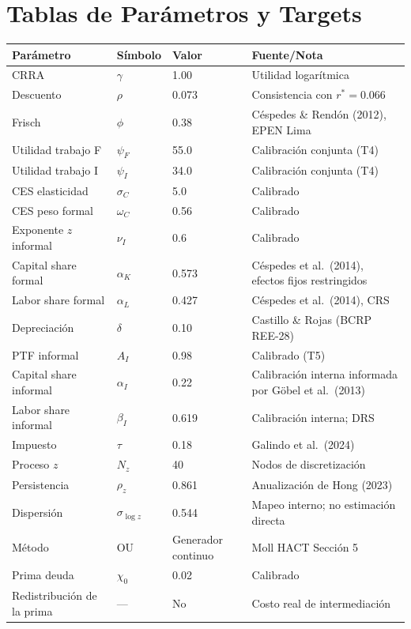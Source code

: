 \documentclass[12pt]{article}
\begin{document}
\clearpage
\section{Tablas de Parámetros y Targets}

\begin{center}
\small
\begin{tabularx}{\textwidth}{lllX}
\toprule
Parámetro & Símbolo & Valor & Fuente/Nota \\
\midrule
CRRA & $\gamma$ & 1.00 & Utilidad logarítmica \\
Descuento & $\rho$ & 0.073 & Consistencia con $r^*=0.066$ \\
Frisch & $\phi$ & 0.38 & Céspedes \& Rendón (2012), EPEN Lima \\
Utilidad trabajo F & $\psi_F$ & 55.0 & Calibración conjunta (T4) \\
Utilidad trabajo I & $\psi_I$ & 34.0 & Calibración conjunta (T4) \\
CES elasticidad & $\sigma_C$ & 5.0 & Calibrado \\
CES peso formal & $\omega_C$ & 0.56 & Calibrado \\
Exponente $z$ informal & $\nu_I$ & 0.6 & Calibrado \\
\addlinespace
Capital share formal & $\alpha_K$ & 0.573 & Céspedes et al.\ (2014), efectos fijos restringidos \\
Labor share formal & $\alpha_L$ & 0.427 & Céspedes et al.\ (2014), CRS \\
Depreciación & $\delta$ & 0.10 & Castillo \& Rojas (BCRP REE-28) \\
PTF informal & $A_I$ & 0.98 & Calibrado (T5) \\
Capital share informal & $\alpha_I$ & 0.22 & Calibración interna informada por Göbel et al.\ (2013) \\
Labor share informal & $\beta_I$ & 0.619 & Calibración interna; DRS \\
\addlinespace
Impuesto & $\tau$ & 0.18 & Galindo et al.\ (2024) \\
\addlinespace
Proceso $z$ & $N_z$ & 40 & Nodos de discretización \\
Persistencia & $\rho_z$ & 0.861 & Anualización de Hong (2023) \\
Dispersión & $\sigma_{\log z}$ & 0.544 & Mapeo interno; no estimación directa \\
Método & OU & Generador continuo & Moll HACT Sección 5 \\
\addlinespace
Prima deuda & $\chi_0$ & 0.02 & Calibrado \\
Redistribución de la prima & --- & No & Costo real de intermediación \\
\bottomrule
\end{tabularx}
\end{center}
\end{document}
